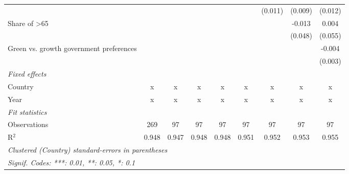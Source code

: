 \begin{table}[htbp]
\begin{tabular}{lcccccccc}
                                              &              &                &         &         &         & (0.011) & (0.009) & (0.012)\\   
      Share of >65                            &              &                &         &         &         &         & -0.013  & 0.004\\   
                                              &              &                &         &         &         &         & (0.048) & (0.055)\\   
      Green vs. growth government preferences &              &                &         &         &         &         &         & -0.004\\   
                                              &              &                &         &         &         &         &         & (0.003)\\   
      \emph{Fixed effects}\\
      Country                                 & x            & x              & x       & x       & x       & x       & x       & x\\  
      Year                                    & x            & x              & x       & x       & x       & x       & x       & x\\  
      \midrule \emph{Fit statistics}\\
      Observations                            & 269          & 97             & 97      & 97      & 97      & 97      & 97      & 97\\  
      R$^2$                                   & 0.948        & 0.947          & 0.948   & 0.948   & 0.951   & 0.952   & 0.953   & 0.955\\  
      \midrule
      \multicolumn{9}{l}{\emph{Clustered (Country) standard-errors in parentheses}}\\
      \multicolumn{9}{l}{\emph{Signif. Codes: ***: 0.01, **: 0.05, *: 0.1}}\\
   \end{tabular}
\end{table}


